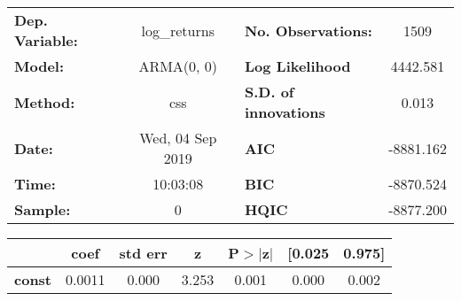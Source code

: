 \begin{center}
\begin{tabular}{lclc}
\toprule
\textbf{Dep. Variable:} &   log\_returns   & \textbf{  No. Observations:  } &    1509     \\
\textbf{Model:}         &    ARMA(0, 0)    & \textbf{  Log Likelihood     } &  4442.581   \\
\textbf{Method:}        &       css        & \textbf{  S.D. of innovations} &   0.013     \\
\textbf{Date:}          & Wed, 04 Sep 2019 & \textbf{  AIC                } & -8881.162   \\
\textbf{Time:}          &     10:03:08     & \textbf{  BIC                } & -8870.524   \\
\textbf{Sample:}        &        0         & \textbf{  HQIC               } & -8877.200   \\
\bottomrule
\end{tabular}
\begin{tabular}{lcccccc}
               & \textbf{coef} & \textbf{std err} & \textbf{z} & \textbf{P$> |$z$|$} & \textbf{[0.025} & \textbf{0.975]}  \\
\midrule
\textbf{const} &       0.0011  &        0.000     &     3.253  &         0.001        &        0.000    &        0.002     \\
\bottomrule
\end{tabular}
\end{center}
